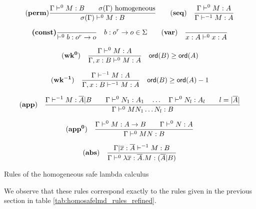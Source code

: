 \begin{table}[htbp]
$$  (\mbox{\textbf{perm}}) {
      { \Gamma \vdash^0 M:B \qquad \sigma(\Gamma)  } \hbox{ homogeneous}
    \over
      { \sigma(\Gamma) \vdash^0 M : B }
    }
\qquad
\mathbf{(seq)} \quad \frac{\displaystyle \Gamma \vdash^{0} M : A}{\Gamma \vdash^{-1} M : A}
$$

$$
 \textbf{(const)}
    { \over { \vdash^0 b : o^r \rightarrow o}} \quad b : o^r \rightarrow o \in \Sigma
\qquad
 \mathbf{(var)} \quad  \frac{\displaystyle }{x : A\vdash^{0} x : A} $$

$$ \mathbf{(wk^{0})} \quad  \frac{\displaystyle \Gamma \vdash^{0} M : A}{\Gamma , x : B \vdash^{0} M : A} \quad {\sf ord}(B) \geq {\sf ord}(A) $$

$$ \mathbf{(wk^{-1})} \quad  \frac{\displaystyle \Gamma \vdash^{-1} M : A}{\Gamma , x : B \vdash^{-1} M : A} \quad {\sf ord}(B) \geq {\sf ord}(A) -1$$

$$ \mathbf{(app)} \quad  \frac{\displaystyle \Gamma \vdash^{-1} M : \overline{A} | B
                                        \qquad \Gamma \vdash^{0} N_1 : A_1
                                        \quad \ldots \quad \Gamma \vdash^{0} N_l : A_l
                                        \qquad l = |\overline{A}|
                                        }{\Gamma  \vdash^{0} M N_1 \ldots N_l : B}
$$


$$ \mathbf{(app^0)} \quad  \frac{\displaystyle \Gamma \vdash^0 M : A\rightarrow B
                                        \qquad \Gamma \vdash^{0} N : A
                                   }{\Gamma  \vdash^{0} M N : B}$$

$$ \mathbf{(abs)} \quad  \frac{\displaystyle \Gamma| \overline{x} : \overline{A} \vdash^{-1} M : B}{\Gamma  \vdash^{0} \lambda \overline{x} : \overline{A} . M : (\overline{A}|B)}$$
\caption{Rules of the homogeneous safe lambda calculus}
\label{tab:homosafelmd_rules}
\end{table}


We observe that these rules correspond exactly to the rules given in the previous section
in table \ref{tab:homosafelmd_rules_refined}.
